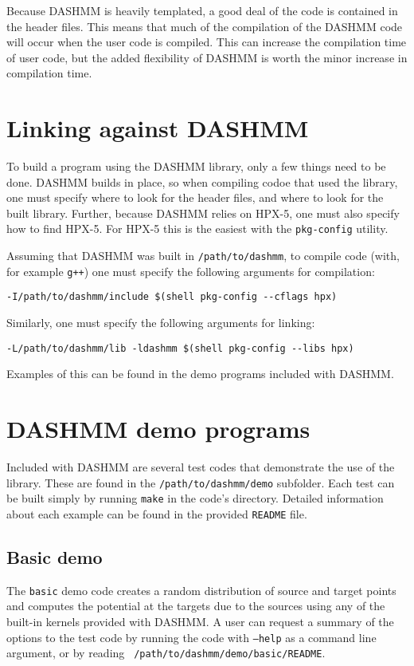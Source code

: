 Because DASHMM is heavily templated, a good deal of the code is
contained in the header files. This means that much of the compilation
of the DASHMM code will occur when the user code is compiled. This can
increase the compilation time of user code, but the added flexibility
of DASHMM is worth the minor increase in compilation time.

\section{Linking against DASHMM}

To build a program using the DASHMM library, only a few things need to
be done. DASHMM builds in place, so when compiling codoe that used the
library, one must specify where to look for the header files, and
where to look for the built library. Further, because DASHMM relies on
HPX-5, one must also specify how to find HPX-5. For HPX-5 this is the
easiest with the {\tt pkg-config} utility.

Assuming that DASHMM was built in {\tt /path/to/dashmm}, to compile
code (with, for example {\tt g++}) one must specify the following
arguments for compilation:

\begin{verbatim}
-I/path/to/dashmm/include $(shell pkg-config --cflags hpx)
\end{verbatim}

\noindent Similarly, one must specify the following arguments for linking:

\begin{verbatim}
-L/path/to/dashmm/lib -ldashmm $(shell pkg-config --libs hpx)
\end{verbatim}

\noindent Examples of this can be found in the demo programs included with
DASHMM.

\section{DASHMM demo programs}

Included with DASHMM are several test codes that demonstrate the use
of the library. These are found in the {\tt /path/to/dashmm/demo}
subfolder. Each test can be built simply by running {\tt make} in the
code's directory. Detailed information about each example can be found in
the provided {\tt README} file.

\subsection{Basic demo}
The {\tt basic} demo code creates a random distribution of source and
target points and computes the potential at the targets due to the
sources using any of the built-in kernels provided with DASHMM. A user
can request a summary of the options to the test code by running the
code with {\tt --help} as a command line argument, or by reading {\tt
  /path/to/dashmm/demo/basic/README}.

